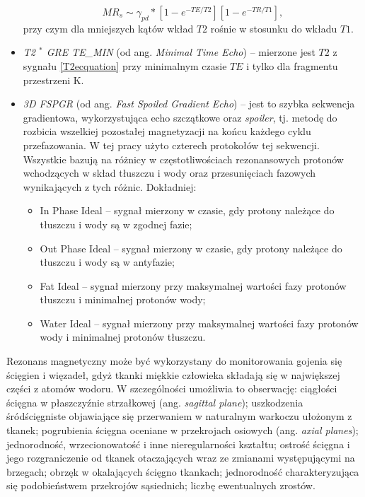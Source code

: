 \begin{itemize}
	\begin{equation}
	MR_s \sim \gamma_{pd} \ast [1-e^{-TE/T2}][1-e^{-TR/T1}],
	\end{equation}
	przy czym dla mniejszych kątów wkład $T2$ rośnie w stosunku do wkładu $T1$.
	\item \textit{T2 $^\ast$ GRE TE\_MIN} (od ang. \textit{Minimal Time Echo}) -- mierzone jest $T2$ z sygnału \ref{T2ecquation} przy minimalnym czasie $TE$ i tylko dla fragmentu przestrzeni K. 
	\item \textit{3D FSPGR} (od ang. \textit{Fast Spoiled Gradient Echo}) -- jest to szybka sekwencja gradientowa, wykorzystująca echo szczątkowe oraz \textit{spoiler}, tj. metodę do rozbicia wszelkiej pozostałej magnetyzacji na końcu każdego cyklu przefazowania. W tej pracy użyto czterech protokołów tej sekwencji. Wszystkie bazują na różnicy w częstotliwościach rezonansowych protonów wchodzących w skład tłuszczu i wody oraz przesunięciach fazowych wynikających z tych różnic. Dokładniej:
	\begin{itemize}
		\item In Phase Ideal -- sygnał mierzony w czasie, gdy protony należące do tłuszczu i wody są w zgodnej fazie;
		\item Out Phase Ideal -- sygnał mierzony w czasie, gdy protony należące do tłuszczu i wody są w antyfazie;
		\item Fat Ideal -- sygnał mierzony przy maksymalnej wartości fazy protonów tłuszczu i minimalnej protonów wody;
		\item Water Ideal -- sygnał mierzony przy maksymalnej wartości fazy protonów wody i minimalnej protonów tłuszczu.
	\end{itemize}
\end{itemize}

Rezonans magnetyczny może być wykorzystany do monitorowania gojenia się ścięgien i więzadeł, gdyż tkanki miękkie człowieka składają się w największej części z atomów wodoru. W szczególności umożliwia to obserwację: ciągłości ścięgna w płaszczyźnie strzałkowej (ang. \textit{sagittal plane}); uszkodzenia śródścięgniste objawiające się przerwaniem w naturalnym warkoczu ułożonym z tkanek; pogrubienia ścięgna oceniane w przekrojach osiowych (ang. \textit{axial planes}); jednorodność, wrzecionowatość i inne nieregularności kształtu; ostrość ścięgna i jego rozgraniczenie od tkanek otaczających wraz ze zmianami występującymi na brzegach; obrzęk w okalających ścięgno tkankach; jednorodność charakteryzująca się podobieństwem przekrojów sąsiednich; liczbę ewentualnych zrostów.

